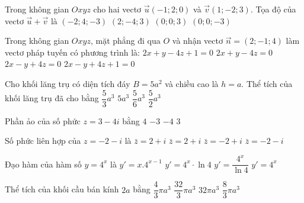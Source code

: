 \begin{ex}%
Trong không gian $Oxyz$ cho hai vectơ $\vec{u}(-1; 2; 0)$ và $\vec{v}(1;-2; 3)$. Tọa độ của vectơ $\vec{u}+\vec{v}$ là
\choice
{$(-2; 4;-3)$}
{$(2;-4; 3)$}
{\True $(0; 0; 3)$}
{$(0; 0;-3)$}

\end{ex}
\begin{ex}%
{\vspace{-0.5cm}

}

\end{ex}
\begin{ex}%
Trong không gian $O x y z$, mặt phẳng đi qua $O$ và nhận vectơ $\vec{n}=(2;-1; 4)$ làm vectơ pháp tuyến có phương trình là:
\choice
{$2 x+y-4 z+1=0$}
{$2 x+y-4 z=0$}
{\True $2 x-y+4 z=0$}
{$2 x-y+4 z+1=0$}

\end{ex}
\begin{ex}%
Cho khối lăng trụ có diện tích đáy $B=5 a^2$ và chiều cao là $h=a$. Thể tích của khối lăng trụ đã cho bằng
\choice
{$\dfrac{5}{3} a^3$}
{\True $5 a^3$}
{$\dfrac{5}{6} a^3$}
{$\dfrac{5}{2} a^3$}

\end{ex}
\begin{ex}%
Phần ảo của số phức $z=3-4 i$ bằng
\choice
{$4$}
{$-3$}
{\True $-4$}
{$3$}

\end{ex}
\begin{ex}%
Số phức liên hợp của $z=-2-i$ là
\choice
{\True $\bar{z}=2+i$}
{$\bar{z}=2+i$}
{$\bar{z}=-2+i$}
{$\bar{z}=-2-i$}

\end{ex}
\begin{ex}%
Đạo hàm của hàm số $y=4^{x}$ là
\choice
{$y'=x.4^{x-1}$}
{\True $y'=4^{x} \cdot \ln 4$}
{$y'=\dfrac{4^{x}}{\ln 4}$}
{$y'=4^{x}$}

\end{ex}
\begin{ex}%
Thể tích của khối cầu bán kính $2 a$ bằng
\choice
{$\dfrac{4}{3} \pi a^3$}
{\True $\dfrac{32}{3} \pi a^3$}
{$32\pi a^3$}
{$\dfrac{8}{3} \pi a^3$}

\end{ex}
